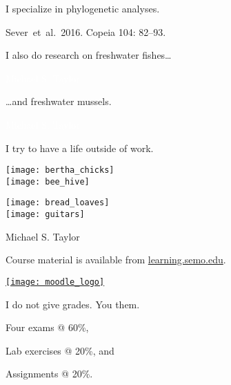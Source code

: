 \documentclass[t]{beamer}
\begin{document}
%
{
	\begin{frame}[t]{I specialize in phylogenetic analyses.}
		
		\vfilll
		
		\hfill \tiny Sever~et~al.~2016. Copeia 104: 82–93.
	\end{frame}
}
%
{
	\begin{frame}[t]{I also do research on freshwater fishes\dots}
		
		\vfilll
		
		\hfill \tiny \textcolor{white}{Michael S. Taylor }
	\end{frame}
}
%
{
	\begin{frame}[t]{\dots and freshwater mussels.}
		
		\vfilll

		\tiny \textcolor{white}{Michael S. Taylor }
	\end{frame}
}
%
\begin{frame}[t]{I try to have a life outside of work.}

	\vspace*{-\baselineskip}
	
	\begin{multicols}{2}
		\texttt{[image: bertha\_chicks]} \\[1ex]
		\texttt{[image: bee\_hive]} \\
		
	\columnbreak
		
		\texttt{[image: bread\_loaves]} \\[1ex]
		\texttt{[image: guitars]} \\
		
	\end{multicols}
		
		\vfilll

	\hfill \tiny Michael S. Taylor 

\end{frame}
%
\begin{frame}[t]{Course material is available from \href{http://learning.semo.edu}{learning.semo.edu}.}
	\begin{center}
		
		\href{http://learning.semo.edu}{\texttt{[image: moodle\_logo]}}
		
		\medskip
		
	\end{center}
	
\end{frame}
%
\begin{frame}[t]{I do not give grades. You  them.}

	\hangpara Four exams @ 60\%,

	\hangpara Lab exercises @ 20\%, and

	\hangpara Assignments @ 20\%.

\end{frame}
%
\end{document}

